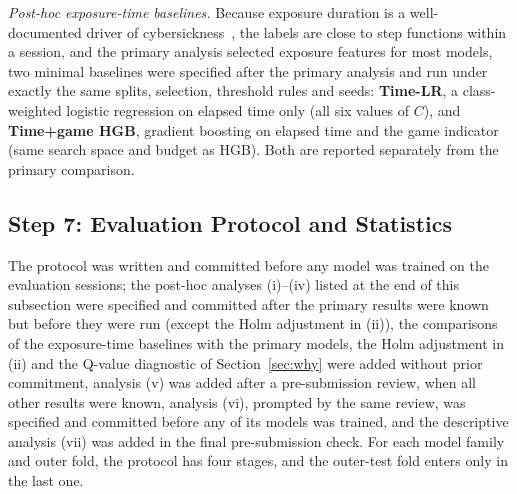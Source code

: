 \emph{Post-hoc exposure-time baselines.} Because exposure duration is a well-documented driver of cybersickness~\cite{kennedy2000duration}, the labels are close to step functions within a session, and the primary analysis selected exposure features for most models, two minimal baselines were specified after the primary analysis and run under exactly the same splits, selection, threshold rules and seeds: \textbf{Time-LR}, a class-weighted logistic regression on elapsed time only (all six values of $C$), and \textbf{Time+game HGB}, gradient boosting on elapsed time and the game indicator (same search space and budget as HGB). Both are reported separately from the primary comparison.

\subsection{Step 7: Evaluation Protocol and Statistics}
\label{sec:protocol}
The protocol was written and committed before any model was trained on the evaluation sessions; the post-hoc analyses (i)--(iv) listed at the end of this subsection were specified and committed after the primary results were known but before they were run (except the Holm adjustment in (ii)), the comparisons of the exposure-time baselines with the primary models, the Holm adjustment in (ii) and the Q-value diagnostic of Section~\ref{sec:why} were added without prior commitment, analysis (v) was added after a pre-submission review, when all other results were known, analysis (vi), prompted by the same review, was specified and committed before any of its models was trained, and the descriptive analysis (vii) was added in the final pre-submission check. For each model family and outer fold, the protocol has four stages, and the outer-test fold enters only in the last one.
